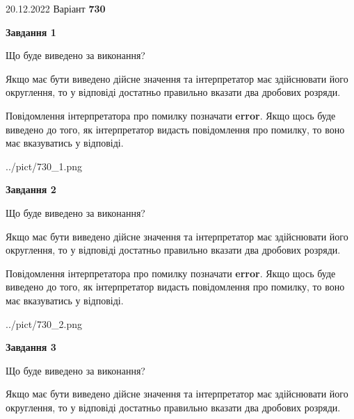 \documentclass[12pt, ukrainian]{article}
\begin{document}
{20.12.2022 Варіант \No \textbf { 730 }\par}
{
\begin {Large}

{\begin {center}\textbf{Завдання 1}\end {center}}\par
Що буде виведено за виконання? \par

Якщо має бути виведено дійсне значення та інтерпретатор має здійснювати його округлення, 
то у відповіді достатньо правильно вказати два дробових розряди.

Повідомлення інтерпретатора про помилку позначати \textbf{error}.
Якщо щось буде виведено до того, як інтерпретатор видасть повідомлення про помилку, 
то воно має вказуватись у відповіді. \par

\begin{center}
	{../pict/730_1.png}
\end{center}
\newpage

{\begin {center}\textbf{Завдання 2}\end {center}}\par
Що буде виведено за виконання? \par

Якщо має бути виведено дійсне значення та інтерпретатор має здійснювати його округлення, 
то у відповіді достатньо правильно вказати два дробових розряди.

Повідомлення інтерпретатора про помилку позначати \textbf{error}.
Якщо щось буде виведено до того, як інтерпретатор видасть повідомлення про помилку, 
то воно має вказуватись у відповіді. \par

\begin{center}
	{../pict/730_2.png}
\end{center}
\newpage

{\begin {center}\textbf{Завдання 3}\end {center}}\par
Що буде виведено за виконання? \par

Якщо має бути виведено дійсне значення та інтерпретатор має здійснювати його округлення, 
то у відповіді достатньо правильно вказати два дробових розряди.


\end{Large}}
\end{document}
